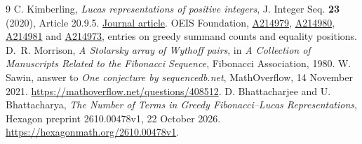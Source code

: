 \documentclass[10pt]{article}
\begin{document}
\begin{thebibliography}{9}
 C. Kimberling, \emph{Lucas representations of positive integers}, J. Integer Seq. \textbf{23} (2020), Article 20.9.5. \href{https://cs.uwaterloo.ca/journals/JIS/VOL23/Kimberling/kimber12.html}{Journal article}.
 OEIS Foundation, \href{https://oeis.org/A214979}{A214979}, \href{https://oeis.org/A214980}{A214980}, \href{https://oeis.org/A214981}{A214981} and \href{https://oeis.org/A214973}{A214973}, entries on greedy summand counts and equality positions.
 D.~R. Morrison, \emph{A Stolarsky array of Wythoff pairs}, in \emph{A Collection of Manuscripts Related to the Fibonacci Sequence}, Fibonacci Association, 1980.
 W. Sawin, answer to \emph{One conjecture by sequencedb.net}, MathOverflow, 14 November 2021. \url{https://mathoverflow.net/questions/408512}.
 D. Bhattacharjee and U. Bhattacharya, \emph{The Number of Terms in Greedy Fibonacci--Lucas Representations}, Hexagon preprint 2610.00478v1, 22 October 2026. \url{https://hexagonmath.org/2610.00478v1}.
\end{thebibliography}
\end{document}
